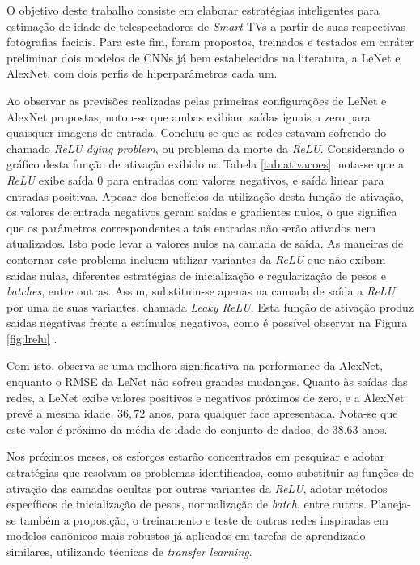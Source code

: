O objetivo deste trabalho consiste em elaborar estratégias inteligentes para estimação de idade de telespectadores de  \emph{Smart} TVs a partir de suas respectivas fotografias faciais. Para este fim, foram propostos, treinados e testados em caráter preliminar dois modelos de CNNs já bem estabelecidos na literatura, a LeNet e AlexNet, com dois perfis de hiperparâmetros cada um.

Ao observar as previsões realizadas pelas primeiras configurações de LeNet e AlexNet propostas, notou-se que ambas exibiam saídas iguais a zero para quaisquer imagens de entrada. Concluiu-se que as redes estavam sofrendo do chamado \emph{ReLU dying problem}, ou problema da morte da \emph{ReLU}. Considerando o gráfico desta função de ativação exibido na Tabela \ref{tab:ativacoes}, nota-se que a \emph{ReLU} exibe saída $0$ para entradas com valores negativos, e saída linear para entradas positivas.
Apesar dos benefícios da utilização desta função de ativação, os valores de entrada negativos geram saídas e gradientes nulos, o que significa que os parâmetros correspondentes a tais entradas não serão ativados nem atualizados. Isto pode levar a valores nulos na camada de saída. As maneiras de contornar este problema incluem utilizar variantes da \emph{ReLU} que não exibam saídas nulas, diferentes estratégias de inicialização e regularização de pesos e \emph{batches}, entre outras. Assim, substituiu-se apenas na camada de saída a \emph{ReLU} por uma de suas variantes, chamada \emph{Leaky ReLU}. Esta função de ativação produz saídas negativas frente a estímulos negativos, como é possível observar na Figura \ref{fig:lrelu} .

Com isto, observa-se uma melhora significativa na performance da AlexNet, enquanto o RMSE da LeNet não sofreu grandes mudanças. Quanto às saídas das redes, a LeNet exibe valores positivos e negativos próximos de zero, e a AlexNet prevê a mesma idade, $36,72$ anos, para qualquer face apresentada. Nota-se que este valor é próximo da média de idade do conjunto de dados, de $38.63$ anos.

Nos próximos meses, os esforços estarão concentrados em pesquisar e adotar estratégias que resolvam os problemas identificados, como substituir as funções de ativação das camadas ocultas por outras variantes da \emph{ReLU}, adotar métodos específicos de inicialização de pesos, normalização de \emph{batch}, entre outros. Planeja-se também a proposição, o treinamento e teste de outras redes inspiradas em modelos canônicos mais robustos já aplicados em tarefas de aprendizado similares, utilizando técnicas de \emph{transfer learning}.
